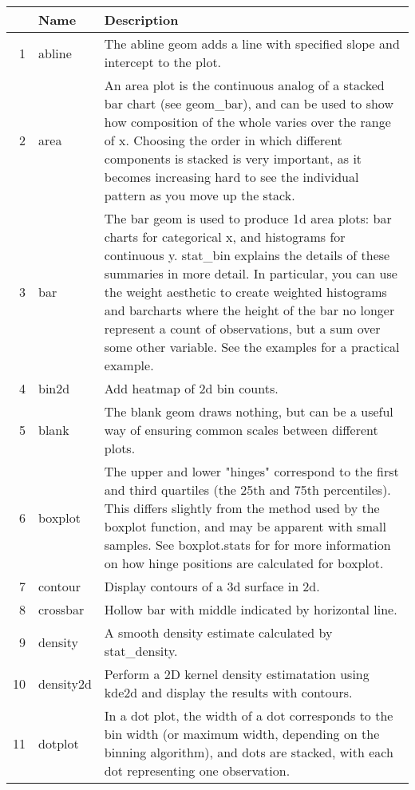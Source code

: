 \begin{table}[ht]
\centering
\begin{tabular}{rll}
  \hline
 & Name & Description \\ 
  \hline
1 & abline & The abline geom adds a line with specified slope and intercept to the plot. \\ 
  2 & area & An area plot is the continuous analog of a stacked bar chart (see geom\_bar), and can be used to show how composition of the whole varies over the range of x. Choosing the order in which different components is stacked is very important, as it becomes increasing hard to see the individual pattern as you move up the stack. \\ 
  3 & bar & The bar geom is used to produce 1d area plots: bar charts for categorical x, and histograms for continuous y. stat\_bin explains the details of these summaries in more detail. In particular, you can use the weight aesthetic to create weighted histograms and barcharts where the height of the bar no longer represent a count of observations, but a sum over some other variable. See the examples for a practical example. \\ 
  4 & bin2d & Add heatmap of 2d bin counts. \\ 
  5 & blank & The blank geom draws nothing, but can be a useful way of ensuring common scales between different plots. \\ 
  6 & boxplot & The upper and lower "hinges" correspond to the first and third quartiles (the 25th and 75th percentiles). This differs slightly from the method used by the boxplot function, and may be apparent with small samples. See boxplot.stats for for more information on how hinge positions are calculated for boxplot. \\ 
  7 & contour & Display contours of a 3d surface in 2d. \\ 
  8 & crossbar & Hollow bar with middle indicated by horizontal line. \\ 
  9 & density & A smooth density estimate calculated by stat\_density. \\ 
  10 & density2d & Perform a 2D kernel density estimatation using kde2d and display the results with contours. \\ 
  11 & dotplot & In a dot plot, the width of a dot corresponds to the bin width (or maximum width, depending on the binning algorithm), and dots are stacked, with each dot representing one observation. \\ 

\end{tabular}
\end{table}
